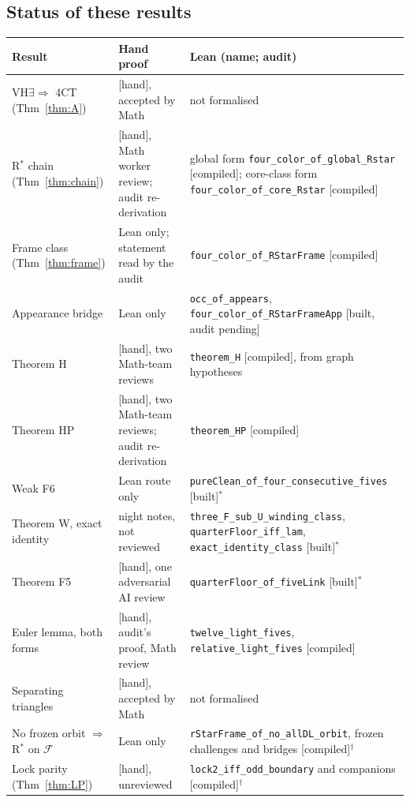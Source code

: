 \documentclass[11pt]{article}
\newcommand{\lab}[1]{\textsf{[#1]}}
\begin{document}
\subsection{Status of these results}\label{sec:lean}
\begin{center}\small
\begin{tabular}{p{3.6cm}p{4.3cm}p{6.1cm}}
Result & Hand proof & Lean (name; audit)\\\hline
VH$\exists\Rightarrow$ 4CT (Thm~\ref{thm:A}) & \lab{hand}, accepted by Math & not formalised\\
R$^\ast$ chain (Thm~\ref{thm:chain}) & \lab{hand}, Math worker review; audit re-derivation & global form \texttt{four\_color\_of\_global\_Rstar} \lab{compiled}; core-class form \texttt{four\_color\_of\_core\_Rstar} \lab{compiled}\\
Frame class (Thm~\ref{thm:frame}) & Lean only; statement read by the audit & \texttt{four\_color\_of\_RStarFrame} \lab{compiled}\\
Appearance bridge & Lean only & \texttt{occ\_of\_appears}, \texttt{four\_color\_of\_RStarFrameApp} \lab{built, audit pending}\\
Theorem H & \lab{hand}, two Math-team reviews & \texttt{theorem\_H} \lab{compiled}, from graph hypotheses\\
Theorem HP & \lab{hand}, two Math-team reviews; audit re-derivation & \texttt{theorem\_HP} \lab{compiled}\\
Weak F6 & Lean route only & \texttt{pureClean\_of\_four\_}\allowbreak\texttt{consecutive\_fives} \lab{built}$^\ast$\\
Theorem W, exact identity & night notes, not reviewed & \texttt{three\_F\_sub\_U\_winding\_class}, \texttt{quarterFloor\_iff\_lam}, \texttt{exact\_identity\_class} \lab{built}$^\ast$\\
Theorem F5 & \lab{hand}, one adversarial AI review & \texttt{quarterFloor\_of\_fiveLink} \lab{built}$^\ast$\\
Euler lemma, both forms & \lab{hand}, audit's proof, Math review & \texttt{twelve\_light\_fives}, \texttt{relative\_light\_fives} \lab{compiled}\\
Separating triangles & \lab{hand}, accepted by Math & not formalised\\
No frozen orbit $\Rightarrow$ R$^\ast$ on $\mathcal F$ & Lean only & \texttt{rStarFrame\_of\_no\_}\allowbreak\texttt{allDL\_orbit}, frozen challenges and bridges \lab{compiled}$^\dagger$\\
Lock parity (Thm~\ref{thm:LP}) & \lab{hand}, unreviewed & \texttt{lock2\_iff\_odd\_boundary} and companions \lab{compiled}$^\dagger$\\

\end{tabular}
\end{center}
\end{document}
